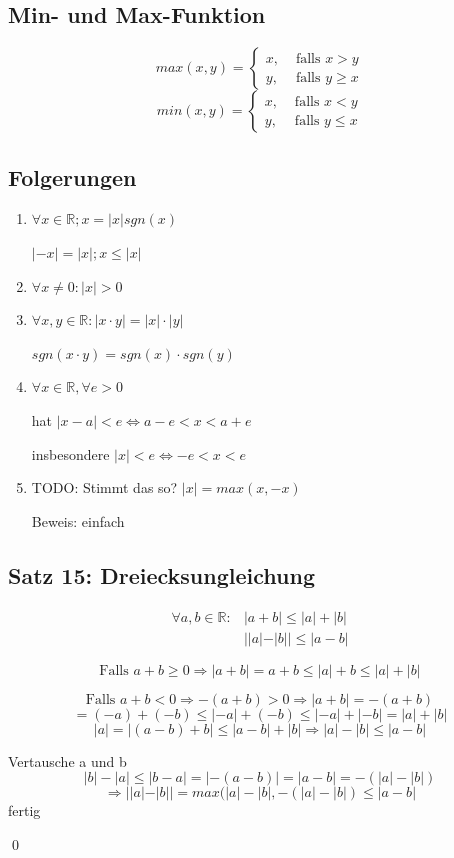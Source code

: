 \documentclass[fleqn]{scrbook}
\newcommand{\R}{\mathbb{R}}
\renewenvironment{proof}{{\bfseries Beweis }}{\qed}
\begin{document}
\subsection{Min- und Max-Funktion}

\[
  max(x,y) = \left\{ 
    \begin{array}{rl}
       x, & \text{ falls } x>y \\
       y, & \text{ falls } y\geq x
    \end{array}\right.
\]
\[
  min(x,y) = \left\{ 
    \begin{array}{rl}
       x, & \text{ falls } x<y \\
       y, & \text{ falls } y\leq x
    \end{array}\right.
\]

\subsection{Folgerungen}

\begin{enumerate}
  \item $\forall x \in \R;x=|x|sgn(x)$
  
    $|-x|=|x|;x \leq |x|$
  \item $\forall x \neq 0: |x|>0$
  \item $\forall x,y \in \R: |x \cdot y|=|x| \cdot |y|$
  
    $sgn(x \cdot y)=sgn(x) \cdot sgn(y)$
  \item $\forall x \in \R, \forall e >0$
  
    hat $|x-a|<e \Longleftrightarrow a-e<x<a+e$
    
    insbesondere $|x|<e \Longleftrightarrow -e<x<e$
  \item TODO: Stimmt das so? $|x|=max(x,-x)$
  
        Beweis: einfach
\end{enumerate}

\subsection{Satz 15: Dreiecksungleichung}

\begin{align*}
  \forall a,b \in \R: & |a+b| \leq |a|+|b|\\
                              & ||a|-|b||\leq|a-b|
\end{align*}

\begin{proof}

\[\text{Falls } a+b \geq 0 \Longrightarrow |a+b|=a+b \leq |a|+b\leq|a|+|b|\]

\[\text{Falls } a+b < 0 \Longrightarrow -(a+b)>0 \Longrightarrow |a+b|=-(a+b)\]
\[=(-a)+(-b)\leq |-a|+(-b)\leq |-a|+ |-b|=|a|+|b|\]
\[|a|=|(a-b)+b|\leq|a-b|+|b|\Longrightarrow |a|-|b|\leq|a-b|\]

Vertausche a und b
\[|b|-|a|\leq |b-a|=|-(a-b)|=|a-b|=-(|a|-|b|)\]
\[\Longrightarrow||a|-|b||=max(|a|-|b|,-(|a|-|b|)\leq |a-b|\]
fertig

\end{proof}
\end{document}
